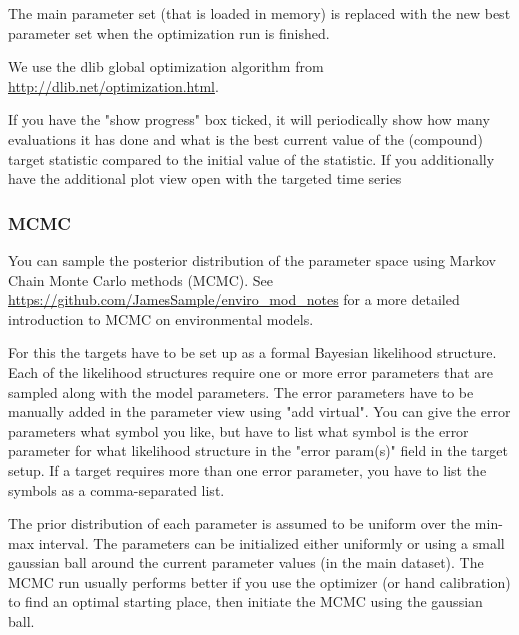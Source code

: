 \documentclass[11pt]{article}
\theoremstyle{definition}
\begin{document}
The main parameter set (that is loaded in memory) is replaced with the new best parameter set when the optimization run is finished.

We use the dlib global optimization algorithm from \url{http://dlib.net/optimization.html}.

If you have the "show progress" box ticked, it will periodically show how many evaluations it has done and what is the best current value of the (compound) target statistic compared to the initial value of the statistic. If you additionally have the additional plot view open with the targeted time series

\subsubsection{MCMC}\label{sec:mcmc}
You can sample the posterior distribution of the parameter space using Markov Chain Monte Carlo methods (MCMC). See \url{https://github.com/JamesSample/enviro_mod_notes} for a more detailed introduction to MCMC on environmental models.

For this the targets have to be set up as a formal Bayesian likelihood structure. Each of the likelihood structures require one or more error parameters that are sampled along with the model parameters. The error parameters have to be manually added in the parameter view using "add virtual". You can give the error parameters what symbol you like, but have to list what symbol is the error parameter for what likelihood structure in the "error param(s)" field in the target setup. If a target requires more than one error parameter, you have to list the symbols as a comma-separated list.

The prior distribution of each parameter is assumed to be uniform over the min-max interval. The parameters can be initialized either uniformly or using a small gaussian ball around the current parameter values (in the main dataset). The MCMC run usually performs better if you use the optimizer (or hand calibration) to find an optimal starting place, then initiate the MCMC using the gaussian ball.
\end{document}
